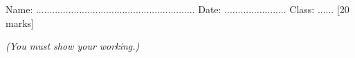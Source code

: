 \documentclass{article}
\date{}
\begin{document}
\fontsize{13}{15} \selectfont %

\begin{center}
  \qquad \\ 
\end{center} \\ 

Name: ...........................................................  \hspace{0.5cm}  Date: ....................... \hspace{0.5cm}  Class: ......\hspace{0.5cm} [20 marks]

\par
\vspace*{10pt} 
\textit{(You must show your working.)  }
\vspace{10pt}



\end{document}
